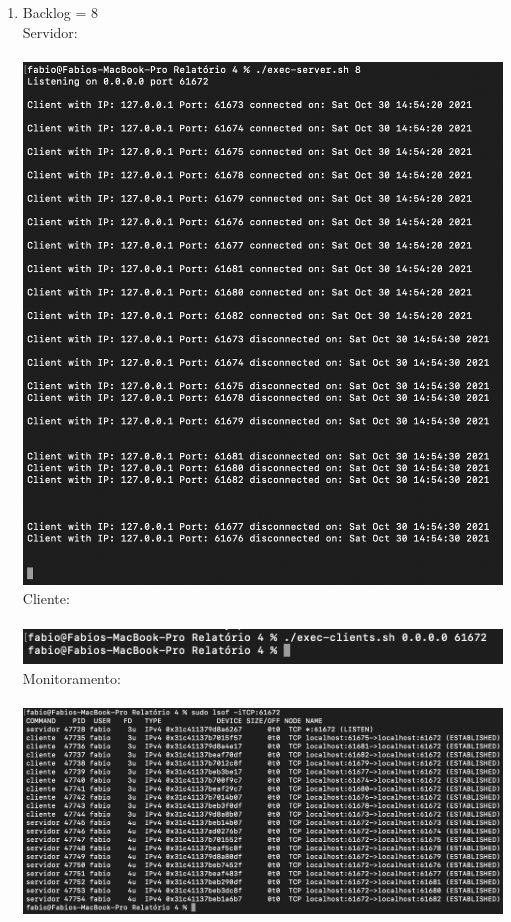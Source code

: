 \documentclass[12pt,a4paper]{report}
\begin{document}
\begin{enumerate}
\begin{enumerate}
        \item Backlog = 8\\
        Servidor:\\\\
        \includegraphics[width=1\textwidth]{images/servidor-backlog-8.png}
        Cliente:\\\\
        \includegraphics[width=1\textwidth]{images/cliente-backlog-8.png}
        Monitoramento:\\\\
        \includegraphics[width=1\textwidth]{images/lsof-backlog-8.png}
        

\end{enumerate}
\end{enumerate}
\end{document}
